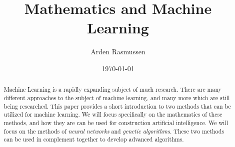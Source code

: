 \documentclass[10pt]{amsart}
\title{Mathematics and Machine Learning}
\author{Arden Rasmussen}
\date{\today}
\begin{document}
\maketitle

\begin{abstract}
  Machine Learning is a rapidly expanding subject of much research. There are
  many different approaches to the subject of machine learning, and many more
  which are still being researched. This paper provides a short introduction to
  two methods that can be utilized for machine learning. We will focus
  specifically on the mathematics of these methods, and how they are can be used
  for construction artificial intelligence. We will focus on the methods of
  \textit{neural networks} and \textit{genetic algorithms}. These two methods
  can be used in complement together to develop advanced algorithms.
\end{abstract}
\end{document}
